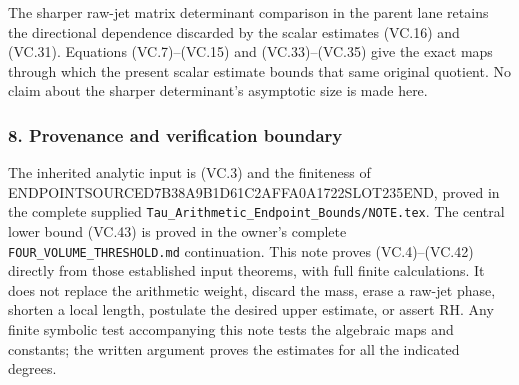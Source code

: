 The sharper raw-jet matrix determinant comparison in the parent lane retains the directional dependence discarded by the scalar estimates (VC.16) and (VC.31). Equations (VC.7)--(VC.15) and (VC.33)--(VC.35) give the exact maps through which the present scalar estimate bounds that same original quotient. No claim about the sharper determinant's asymptotic size is made here.

\subsubsection{8. Provenance and verification boundary}\label{endpoint-volume_connection_original--provenance-and-verification-boundary}

The inherited analytic input is (VC.3) and the finiteness of ENDPOINTSOURCED7B38A9B1D61C2AFFA0A1722SLOT235END, proved in the complete supplied \texttt{Tau\_Arithmetic\_Endpoint\_Bounds/NOTE.tex}. The central lower bound (VC.43) is proved in the owner's complete \texttt{FOUR\_VOLUME\_THRESHOLD.md} continuation. This note proves (VC.4)--(VC.42) directly from those established input theorems, with full finite calculations. It does not replace the arithmetic weight, discard the mass, erase a raw-jet phase, shorten a local length, postulate the desired upper estimate, or assert RH. Any finite symbolic test accompanying this note tests the algebraic maps and constants; the written argument proves the estimates for all the indicated degrees.
